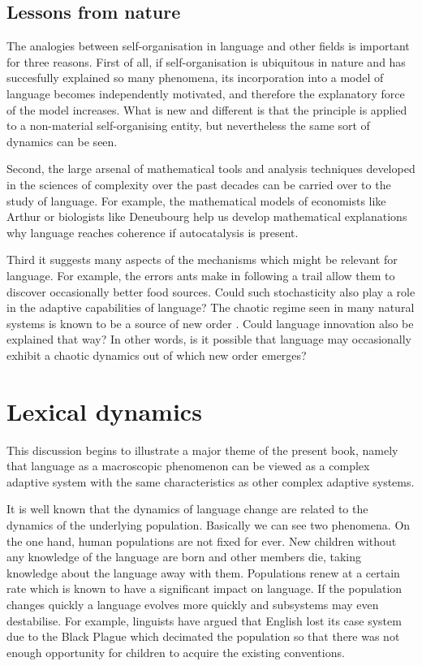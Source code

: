 \subsection{Lessons from nature}

The analogies between self-organisation 
in language and other fields is important for three reasons. 
First of all, if self-organisation is ubiquitous in nature
and has succesfully explained so many phenomena, its incorporation
into a model of language becomes independently motivated, and
therefore the explanatory force of the model increases. 
What is new and different is that the principle is applied
to a non-material self-organising entity, but nevertheless
the same sort of dynamics can be seen. 

Second, the large arsenal of 
mathematical tools and analysis techniques
developed in the sciences of complexity over the past decades
can be carried over to the study of language. For example, 
the mathematical models of economists like 
Arthur or biologists like Deneubourg help us develop 
mathematical explanations why language reaches coherence if autocatalysis
is present.

Third it suggests many aspects of the mechanisms
which might be relevant for language. For example, the errors ants make 
in following a trail allow them to discover occasionally 
better food sources. Could such stochasticity also play a role 
in the adaptive capabilities of language? The chaotic regime
seen in many natural systems is known to be a source
of new order \citep{Kaneko:1996}. Could language innovation 
also be explained that way? In other words, is it possible  
that language may occasionally exhibit a chaotic
dynamics out of which new order emerges?

\section{Lexical dynamics} 

This discussion begins to illustrate a major theme 
of the present book, namely that language as a 
macroscopic phenomenon can be viewed as a complex adaptive 
system with the same characteristics as other complex
adaptive systems. 

It is well known that the dynamics of language change 
are related to the dynamics of the underlying population. Basically
we can see two phenomena. On the one hand, human populations
are not fixed for ever. New children without any knowledge
of the language are born
and other members die, taking knowledge about the 
language away with them. Populations renew at a certain rate 
which is known to have a significant impact on language. 
If the population changes quickly a language
evolves more quickly and subsystems may even destabilise. 
For example, linguists have argued that English lost its 
case system due to the Black Plague which decimated the 
population so that there was not enough opportunity for 
children to acquire the existing conventions. 

